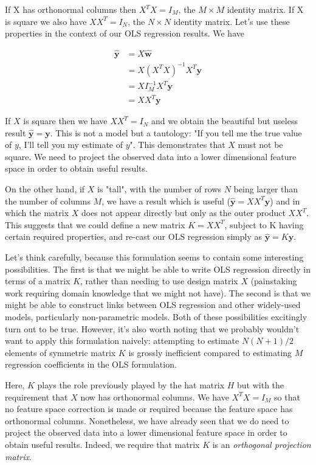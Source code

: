 \documentclass[11pt]{article}
\begin{document}
	If X has orthonormal columns then $X^{T}X = I_{M}$, the $M \times M$ identity matrix. If X is square we also have $XX^{T} = I_{N}$, the $N \times N$ identity matrix. Let's use these properties in the context of our OLS regression results. We have 
	
	\begin{align*}
		\boldsymbol{\hat{y}} &= X\boldsymbol{\hat{w}} \\
		&= X(X^{T}X)^{-1}X^{T}\boldsymbol{y} \\
		&= XI_{M}^{-1}X^{T}\boldsymbol{y} \\
		&= XX^{T}\boldsymbol{y}
	\end{align*}
	
	If $X$ is square then we have $XX^{T} = I_{N}$ and we obtain the beautiful but useless result $\boldsymbol{\hat{y}} = \boldsymbol{y}$. This is not a model but a tautology: "If you tell me the true value of $y$, I'll tell you my estimate of $y$". This demonstrates that $X$ must not be square. We need to project the observed data into a lower dimensional feature space in order to obtain useful results.
	
	On the other hand, if $X$ is "tall", with the number of rows $N$ being larger than the number of columns $M$, we have a result which is useful ($\boldsymbol{\hat{y}} = XX^{T}\boldsymbol{y}$) and in which the matrix $X$ does not appear directly but only as the outer product $XX^{T}$. This suggests that we could define a new matrix $K = XX^{T}$, subject to K having certain required properties, and re-cast our OLS regression simply as $\boldsymbol{\hat{y}} = K\boldsymbol{y}$.
	
	Let's think carefully, because this formulation seems to contain some interesting possibilities. The first is that we might be able to write OLS regression directly in terms of a matrix $K$, rather than needing to use design matrix $X$ (painstaking work requiring domain knowledge that we might not have). The second is that we might be able to construct links between OLS regression and other widely-used models, particularly non-parametric models. Both of these possibilities excitingly turn out to be true. However, it's also worth noting that we probably wouldn't want to apply this formulation naively: attempting to estimate $N(N+1)/2$ elements of symmetric matrix $K$ is grossly inefficient compared to estimating $M$ regression coefficients in the OLS formulation.
	
	Here, $K$ plays the role previously played by the hat matrix $H$ but with the requirement that $X$ now has orthonormal columns. We have $X^{T}X = I_{M}$ so that no feature space correction is made or required because the feature space has orthonormal columns. Nonetheless, we have already seen that we do need to project the observed data into a lower dimensional feature space in order to obtain useful results. Indeed, we require that matrix $K$ is an \emph{orthogonal projection matrix}. 
	
\end{document}
